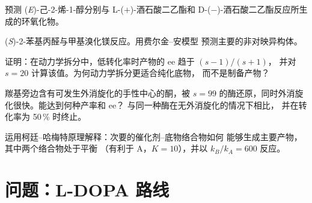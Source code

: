 \begin{exercise}[$\star\star$]\label{exo:b3:asymmetric-synthesis:8}
预测 (\textit{E})-己-2-烯-1-醇分别与 L-($+$)-酒石酸二乙酯和
D-($-$)-酒石酸二乙酯反应所生成的环氧化物。
\end{exercise}

\begin{exercise}[$\star\star$]\label{exo:b3:asymmetric-synthesis:9}
(\textit{S})-2-苯基丙醛与甲基溴化镁反应。用费尔金–安模型
预测主要的非对映异构体。
\end{exercise}

\begin{exercise}[$\star\star\star$]\label{exo:b3:asymmetric-synthesis:10}
证明：在动力学拆分中，低转化率时产物的 ee 趋于 $(s - 1)/(s + 1)$，
并对 $s = 20$ 计算该值。为何动力学拆分更适合纯化底物，
而不是制备产物？
\end{exercise}

\begin{exercise}[$\star\star\star$]\label{exo:b3:asymmetric-synthesis:11}
羰基旁边含有可发生外消旋化的手性中心的酮，被
$s = 99$ 的酶还原，同时外消旋化很快。能达到何种产率和 ee？
与同一种酶在无外消旋化的情况下相比，
并在转化率为 50\,\% 时终止。
\end{exercise}

\begin{exercise}[$\star\star\star$]\label{exo:b3:asymmetric-synthesis:12}
运用柯廷–哈梅特原理解释：次要的催化剂–底物络合物如何
能够生成主要产物，其中两个络合物处于平衡
（有利于 A，$K = 10$），并以 $k_B/k_A = 600$ 反应。
\end{exercise}

\section{问题：L-DOPA 路线}

